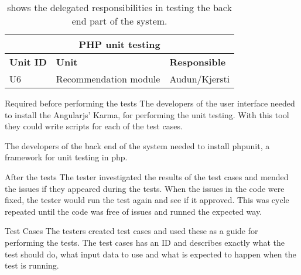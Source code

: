 \begin{table}[!h]
	\begin{center}
		\begin{tabular}{ | l | l | l |}
			\hline
			\multicolumn{3}{|c|}{\textbf{PHP unit testing}} \\
			\hline
			\textbf{Unit ID} & \textbf{Unit} & \textbf{Responsible} \\ \hline
			U6 & Recommendation module & Audun/Kjersti \\ \hline
		\end{tabular}
	\end{center}
	\caption{shows the delegated responsibilities in testing the back end part of the system.}
	\label{Tab:phptesting}
\end{table}

Required before performing the tests\newline
The developers of the user interface needed to install the Angularjs' Karma, for performing the unit testing. With this tool they could write scripts for each of the test cases.\newline

The developers of the back end of the system needed to install phpunit, a framework for unit testing in php.\newline

After the tests\newline
The tester investigated the results of the test cases and mended the issues if they appeared during the tests. When the issues in the code were fixed, the tester would run the test again and see if it approved. This was cycle repeated until the code was free of issues and runned the expected way.\newline

Test Cases\newline
The testers created test cases and used these as a guide for performing the tests. The test cases has an ID and describes exactly what the test should do, what input data to use and what is expected to happen when the test is running.   

